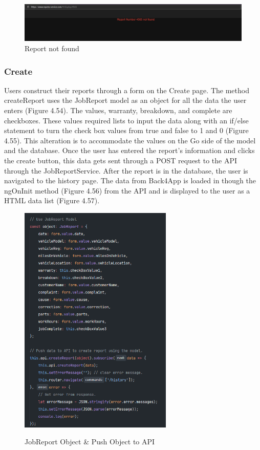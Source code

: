 \begin{figure}[H]
    \caption{Report not found}
    \label{image:ReportNotFound}
    \centering
    \includegraphics[width=1.0\textwidth]{images/repota/UI/report_not_found.png}
\end{figure}

\subsubsection{Create}
Users construct their reports through a form on the Create page. The method createReport uses the JobReport model as an object for all the data the user enters (Figure 4.54). The values, warranty, breakdown, and complete are checkboxes. These values required lists to input the data along with an if/else statement to turn the check box values from true and false to 1 and 0 (Figure 4.55). This alteration is to accommodate the values on the Go side of the model and the database. Once the user has entered the report's information and clicks the create button, this data gets sent through a POST request to the API through the JobReportService. After the report is in the database, the user is navigated to the history page. The data from Back4App is loaded in though the ngOnInit method (Figure 4.56) from the API and is displayed to the user as a HTML data list (Figure 4.57).  

\begin{figure}[H]
    \centering
    \caption{JobReport Object \& Push Object to API}
    \includegraphics[width=0.65\textwidth]{images/repota/report_pages/create_2.png}
    \label{image:createReportObject}
    \centering
\end{figure}

